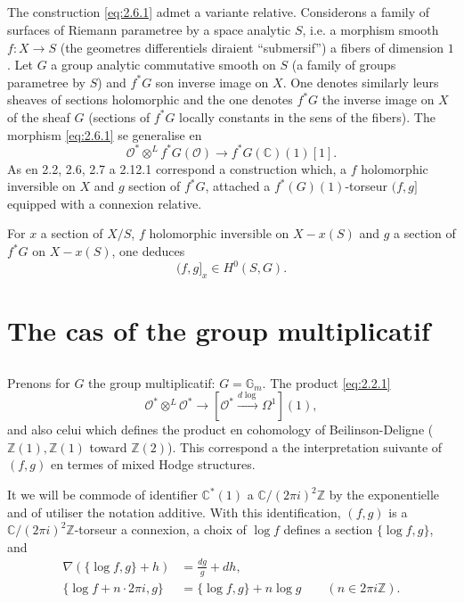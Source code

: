 \documentclass[12pt,a4paper]{article}
\theoremstyle{plain}
\theoremstyle{definition}
\theoremstyle{remark}
\newcommand{\cO}{\mathcal{O}}
\newcommand{\Z}{\mathbb{Z}}
\newcommand{\C}{\mathbb{C}}
\newcommand{\Gm}{\mathbb{G}_m}
\providecommand{\Gm}{\mathbb{G}_{\mathrm m}}
\providecommand{\cO}{\mathcal{O}}
\begin{document}
\subsection{}

The construction \eqref{eq:2.6.1} admet a variante relative. Considerons a family
of surfaces of Riemann parametree by a space analytic $S$, i.e. a morphism
smooth $f : X \to S$ (the geometres differentiels diraient ``submersif'') a fibers of dimension $1$.
Let $G$ a group analytic commutative smooth on $S$ (a family of groups parametree
by $S$) and $f^*G$ son inverse image on $X$. One denotes similarly leurs sheaves of sections holomorphic and the one denotes $f^*G$ the inverse image on $X$ of the sheaf $G$ (sections of $f^*G$ locally constants in the sens of the fibers). The morphism \eqref{eq:2.6.1} se generalise en
\begin{equation}\label{eq:2.12.1}
\cO^* \otimes^L f^*G(\cO) \to f^*G(\C)(1)[1].
\end{equation}
As en 2.2, 2.6, 2.7 a 2.12.1 correspond a construction which, a $f$ holomorphic inversible on $X$ and $g$ section of $f^*G$, attached a $f^*(G)(1)$-torseur $(f,g]$ equipped with a connexion
relative.

For $x$ a section of $X/S$, $f$ holomorphic inversible on $X - x(S)$ and $g$ a section
of $f^*G$ on $X - x(S)$, one deduces
\begin{equation}\label{eq:2.12.2}
(f,g]_x \in H^0(S, G).
\end{equation}

\section{The cas of the group multiplicatif}

\subsection{}

Prenons for $G$ the group multiplicatif: $G = \Gm$. The product \eqref{eq:2.2.1}
\begin{equation}\label{eq:3.1.1}
\cO^* \otimes^L \cO^* \to [\cO^* \xrightarrow{d\log} \Omega^1](1),
\end{equation}
and also celui which defines the product en cohomology of Beilinson-Deligne ($\Z(1), \Z(1)$
toward $\Z(2)$). This correspond a the interpretation suivante of $(f,g)$ en termes of mixed Hodge structures.

It we will be commode of identifier $\C^*(1)$ a $\C/(2\pi i)^2\Z$ by the exponentielle and of utiliser
the notation additive. With this identification, $(f,g)$ is a $\C/(2\pi i)^2\Z$-torseur a connexion,
a choix of $\log f$ defines a section $\{\log f, g\}$, and
\begin{align*}
\nabla(\{\log f, g\} + h) &= \frac{dg}{g} + dh, \\
\{\log f + n \cdot 2\pi i, g\} &= \{\log f, g\} + n \log g \qquad (n \in 2\pi i\Z).
\end{align*}
\end{document}

